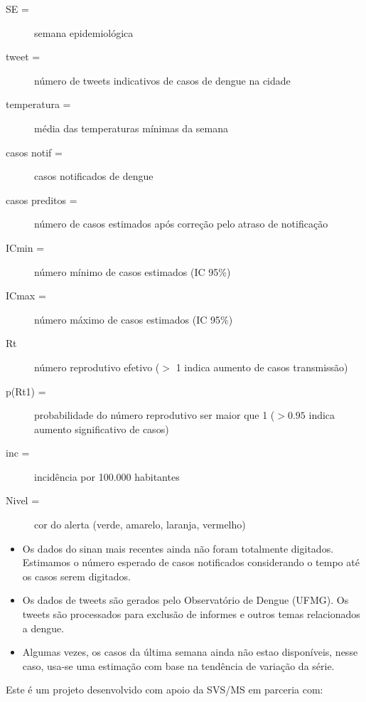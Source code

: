 \documentclass[10pt]{article} %
\begin{document}
\begin{minipage}[t]{1\linewidth} 

\hypertarget{vartab}{}

\begin{description}
\item [SE =] semana epidemiológica
\item [tweet =] número de tweets indicativos de casos de dengue na cidade
\item [temperatura =] média das temperaturas mínimas da semana
\item [casos notif =] casos notificados de dengue 
\item [casos preditos =] número de casos estimados após correção pelo atraso de notificação
\item [ICmin =] número mínimo de casos estimados (IC 95\%)
\item [ICmax =] número máximo de casos estimados (IC 95\%)
\item [Rt] número reprodutivo efetivo ($>$ 1 indica aumento de casos transmissão)
\item [p(Rt1) =] probabilidade do número reprodutivo ser maior que 1 ($>0.95$ indica aumento significativo de casos)
\item [inc =] incidência por 100.000 habitantes
\item [Nivel =] cor do alerta (verde, amarelo, laranja, vermelho)
\end{description}

\hypertarget{notas}{}

\begin{itemize}
\item Os dados do sinan mais recentes ainda não foram totalmente digitados. Estimamos o número esperado de casos notificados considerando o tempo até os casos serem digitados.
\item Os dados de tweets são gerados pelo Observatório de Dengue (UFMG). Os tweets são processados para exclusão de informes e outros temas relacionados a dengue.
\item Algumas vezes, os casos da última semana ainda não estao disponíveis, nesse caso, usa-se uma estimação com base na tendência de variação da série.
\end{itemize}

\hypertarget{creditos}{}

Este é um projeto desenvolvido com apoio da SVS/MS em parceria com:


\end{minipage}
\end{document}
